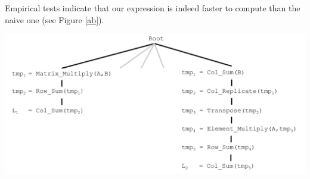 \begin{minipage}{\linewidth}
\begin{framed}
\begin{flushleft}
Empirical tests indicate that our expression is indeed faster to
compute than the naive one (see Figure \ref{ab}).

\includegraphics[scale=0.4]{img/toy_tree.pdf}
\vspace{-5mm}
\end{flushleft}
\end{framed}
\label{fig:example_ab}

\end{minipage}


